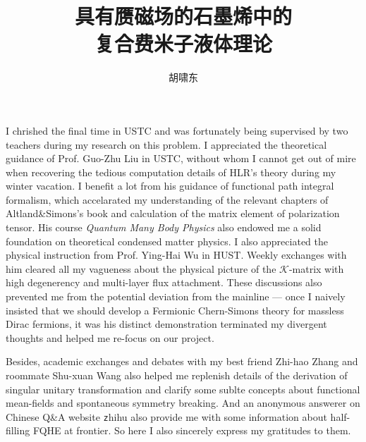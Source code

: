 \documentclass[bachelor,english,numbers]{ustcthesis}
\title{具有赝磁场的石墨烯中的\\复合费米子液体理论}
\author{胡啸东}
\begin{document}
\maketitle

%

\frontmatter

\begin{acknowledgements}
	I chrished the final time in USTC and was fortunately being supervised by two teachers during my research on this problem. I appreciated the theoretical guidance of Prof. Guo-Zhu Liu in USTC, without whom I cannot get out of mire when recovering the tedious computation details of HLR's theory during my winter vacation. I benefit a lot from his guidance of functional path integral formalism, which accelarated my understanding of the relevant chapters of Altland\&Simons's book and calculation of the matrix element of polarization tensor. His course \emph{Quantum Many Body Physics} also endowed me a solid foundation on theoretical condensed matter physics. I also appreciated the physical instruction from Prof. Ying-Hai Wu in HUST. Weekly exchanges with him cleared all my vagueness about the physical picture of the $\mathcal{K}$-matrix with high degenerency and multi-layer flux attachment. These discussions also prevented me from the potential deviation from the mainline --- once I naively insisted that we should develop a Fermionic Chern-Simons theory for massless Dirac fermions, it was his distinct demonstration terminated my divergent thoughts and helped me re-focus on our project.\par
	
	Besides, academic exchanges and debates with my best friend Zhi-hao Zhang and roommate Shu-xuan Wang also helped me replenish details of the derivation of singular unitary transformation and clarify some sublte concepts about functional mean-fields and spontaneous symmetry breaking. And an anonymous answerer on Chinese Q\&A website {\texttt zhihu} also provide me with some information about half-filling FQHE at frontier. So here I also sincerely express my gratitudes to them.
\end{acknowledgements}

\tableofcontents

%
\end{document}
